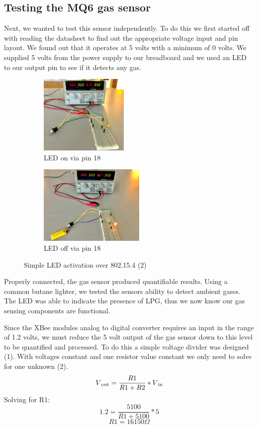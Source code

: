 \documentclass[a4paper,11pt]{report}
\begin{document}
	\subsection{Testing the MQ6 gas sensor}
	\par Next, we wanted to test this sensor independently. To do this we first started off with reading the datasheet to find out the appropriate voltage input and pin layout. We found out that it operates at 5 volts with a minimum of 0 volts. We supplied 5 volts from the power supply to our breadboard and we used an LED to our output pin to see if it detects any gas. 
	\begin{figure}[h!]
		\centering
		\begin{subfigure}[t]{0.45\textwidth}
			\centering
			\includegraphics[height=1.5in]{mq6Test.png}
			\caption{LED on via pin 18}
		\end{subfigure}
		\begin{subfigure}[t]{0.45\textwidth}
			\centering
			\includegraphics[height=1.5in]{mq6TestOn.png}
			\caption{LED off via pin 18}
		\end{subfigure}
		\caption{Simple LED activation over 802.15.4 (2)}
	\end{figure}
	\par Properly connected, the gas sensor produced quantifiable results. Using a common butane lighter, we tested the sensors ability to detect ambient gases. The LED was able to indicate the presence of LPG, thus we now know our gas sensing components are functional.
	\par Since the XBee modules analog to digital converter requires an input in the range of 1.2 volts, we must reduce the 5 volt output of the gas sensor down to this level to be quantified and processed. To do this a simple voltage divider was designed (1). With voltages constant and one resistor value constant we only need to solve for one unknown (2).
	\begin{equation}
	V\textsubscript{out}=\frac{R1}{R1+R2}*V\textsubscript{in}
	\end{equation}
	Solving for R1: \\
	\begin{equation}
	1.2 = \frac{5100}{R1+5100}*5
	\end{equation}
	\[R1 = 16150 \Omega\]
	
\end{document}
